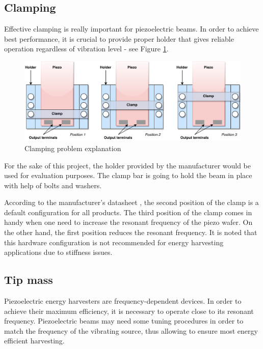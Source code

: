 \documentclass[12pt,a4paper]{article}
\begin{document}
\subsection{Clamping}
Effective clamping is really important for piezoelectric beams. In order to achieve best performance, it is crucial to provide proper holder that gives reliable operation regardless of vibration level - see Figure \ref{fig:clamping}.\par

\begin{figure}[ht!]
\includegraphics[scale=0.85]{clamping.pdf}
\caption{Clamping problem explanation}
\label{fig:clamping}
\end{figure}

For the sake of this project, the holder provided by the manufacturer would be used for evaluation purposes. The clamp bar is going to hold the beam in place with help of bolts and washers.\par
According to the manufacturer's datasheet \cite{PPA}, the second position of the clamp is a default configuration for all products. The third position of the clamp comes in handy when one need to increase the resonant frequency of the piezo wafer. On the other hand, the first position reduces the resonant frequency. It is noted that this hardware configuration is not recommended for energy harvesting applications due to stiffness issues.\par

\subsection{Tip mass}
Piezoelectric energy harvesters are frequency-dependent devices. In order to achieve their maximum efficiency, it is necessary to operate close to its resonant frequency. Piezoelectric beams may need some tuning procedures in order to match the frequency of the vibrating source, thus allowing to ensure most energy efficient harvesting.\par
\end{document}
